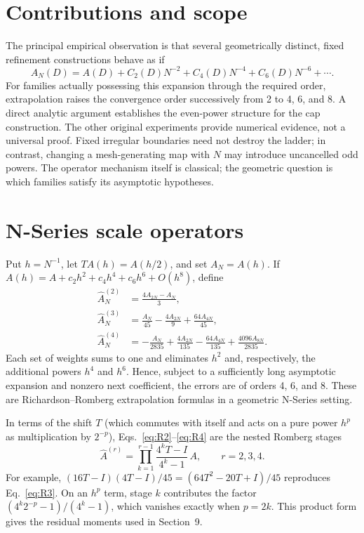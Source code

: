 \documentclass[11pt]{article}
\theoremstyle{remark}
\newcommand{\Ahat}{\widehat{A}}
\begin{document}
\section{Contributions and scope}
The principal empirical observation is that several geometrically distinct, fixed refinement
constructions behave as if
\begin{equation}\label{eq:expansion}
A_N(D)=A(D)+C_2(D)N^{-2}+C_4(D)N^{-4}+C_6(D)N^{-6}+\cdots .
\end{equation}
For families actually possessing this expansion through the required order, extrapolation
raises the convergence order successively from 2 to 4, 6, and 8. A direct analytic argument
establishes the even-power structure for the cap construction. The other original experiments
provide numerical evidence, not a universal proof. Fixed irregular boundaries need not destroy
the ladder; in contrast, changing a mesh-generating map with $N$ may introduce uncancelled odd
powers. The operator mechanism itself is classical; the geometric question is which families
satisfy its asymptotic hypotheses.

\section{N-Series scale operators}
Put $h=N^{-1}$, let $TA(h)=A(h/2)$, and set $A_N=A(h)$. If
$A(h)=A+c_2h^2+c_4h^4+c_6h^6+O(h^8)$, define
\begin{align}
\Ahat^{(2)}_N &= \frac{4A_{2N}-A_N}{3}, \label{eq:R2}\\
\Ahat^{(3)}_N &= \frac{A_N}{45}-\frac{4A_{2N}}{9}+\frac{64A_{4N}}{45}, \label{eq:R3}\\
\Ahat^{(4)}_N &= -\frac{A_N}{2835}+\frac{4A_{2N}}{135}-\frac{64A_{4N}}{135}+\frac{4096A_{8N}}{2835}. \label{eq:R4}
\end{align}
Each set of weights sums to one and eliminates $h^2$ and, respectively, the additional powers
$h^4$ and $h^6$. Hence, subject to a sufficiently long asymptotic expansion and nonzero next
coefficient, the errors are of orders 4, 6, and 8. These are Richardson--Romberg extrapolation
formulas in a geometric N-Series setting.

In terms of the shift $T$ (which commutes with itself and acts on a pure power $h^p$ as
multiplication by $2^{-p}$), Eqs.~\eqref{eq:R2}--\eqref{eq:R4} are the nested Romberg stages
\[
\Ahat^{(r)}=\prod_{k=1}^{r-1}\frac{4^{k}T-I}{4^{k}-1}\,A,\qquad r=2,3,4 .
\]
For example, $(16T-I)(4T-I)/45=(64T^2-20T+I)/45$ reproduces Eq.~\eqref{eq:R3}. On an $h^p$
term, stage $k$ contributes the factor $(4^k2^{-p}-1)/(4^k-1)$, which vanishes exactly when
$p=2k$. This product form gives the residual moments used in Section~9.
\end{document}
